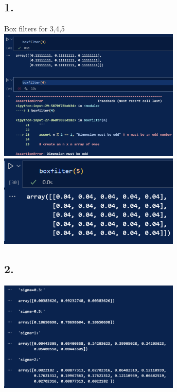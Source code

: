 \documentclass[12pt]{article}
\begin{document}
\subsection*{1.}
Box filters for 3,4,5
\\
\includegraphics[width=0.65\textwidth]{imgs/1-1.png}\\
\includegraphics[width=0.65\textwidth]{imgs/1-2.png}
\subsection*{2.}
\includegraphics[width=0.65\textwidth]{imgs/2-1.png}
\end{document}
